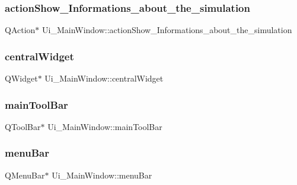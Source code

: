 \subsubsection{\texorpdfstring{action\+Show\+\_\+\+Informations\+\_\+about\+\_\+the\+\_\+simulation}{actionShow\_Informations\_about\_the\_simulation}}
{\footnotesize\ttfamily Q\+Action$\ast$ Ui\+\_\+\+Main\+Window\+::action\+Show\+\_\+\+Informations\+\_\+about\+\_\+the\+\_\+simulation}

\hypertarget{class_ui___main_window_a30075506c2116c3ed4ff25e07ae75f81}{}\label{class_ui___main_window_a30075506c2116c3ed4ff25e07ae75f81} 
\subsubsection{\texorpdfstring{central\+Widget}{centralWidget}}
{\footnotesize\ttfamily Q\+Widget$\ast$ Ui\+\_\+\+Main\+Window\+::central\+Widget}

\hypertarget{class_ui___main_window_a5172877001c8c7b4e0f6de50421867d1}{}\label{class_ui___main_window_a5172877001c8c7b4e0f6de50421867d1} 
\subsubsection{\texorpdfstring{main\+Tool\+Bar}{mainToolBar}}
{\footnotesize\ttfamily Q\+Tool\+Bar$\ast$ Ui\+\_\+\+Main\+Window\+::main\+Tool\+Bar}

\hypertarget{class_ui___main_window_a2be1c24ec9adfca18e1dcc951931457f}{}\label{class_ui___main_window_a2be1c24ec9adfca18e1dcc951931457f} 
\subsubsection{\texorpdfstring{menu\+Bar}{menuBar}}
{\footnotesize\ttfamily Q\+Menu\+Bar$\ast$ Ui\+\_\+\+Main\+Window\+::menu\+Bar}

\hypertarget{class_ui___main_window_a5c5d8a3ce3a66bcfa127ce419a00ab3b}{}\label{class_ui___main_window_a5c5d8a3ce3a66bcfa127ce419a00ab3b} 
